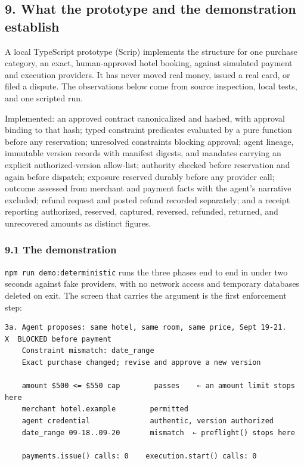 \documentclass[
  11pt,
  letterpaper,
]{article}
\begin{document}
\subsection{9. What the prototype and the demonstration
establish}\label{what-the-prototype-and-the-demonstration-establish}

A local TypeScript prototype (Scrip) implements the structure for one
purchase category, an exact, human-approved hotel booking, against
simulated payment and execution providers. It has never moved real
money, issued a real card, or filed a dispute. The observations below
come from source inspection, local tests, and one scripted run.

Implemented: an approved contract canonicalized and hashed, with
approval binding to that hash; typed constraint predicates evaluated by
a pure function before any reservation; unresolved constraints blocking
approval; agent lineage, immutable version records with manifest
digests, and mandates carrying an explicit authorized-version
allow-list; authority checked before reservation and again before
dispatch; exposure reserved durably before any provider call; outcome
assessed from merchant and payment facts with the agent's narrative
excluded; refund request and posted refund recorded separately; and a
receipt reporting authorized, reserved, captured, reversed, refunded,
returned, and unrecovered amounts as distinct figures.

\subsubsection{9.1 The demonstration}\label{the-demonstration}

\texttt{npm\ run\ demo:deterministic} runs the three phases end to end
in under two seconds against fake providers, with no network access and
temporary databases deleted on exit. The screen that carries the
argument is the first enforcement step:

\begin{verbatim}
3a. Agent proposes: same hotel, same room, same price, Sept 19-21.
X  BLOCKED before payment
    Constraint mismatch: date_range
    Exact purchase changed; revise and approve a new version

    amount $500 <= $550 cap        passes    ← an amount limit stops here
    merchant hotel.example        permitted
    agent credential              authentic, version authorized
    date_range 09-18..09-20       mismatch  ← preflight() stops here

    payments.issue() calls: 0    execution.start() calls: 0
\end{verbatim}
\end{document}
